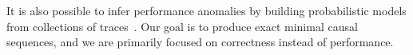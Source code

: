 {It is also possible to infer
 performance anomalies by building probabilistic models from
 collections of traces~\cite{barham2004using,Chen02pinpoint:problem}.
 Our goal is to produce exact minimal causal sequences, and we are primarily focused on
 correctness instead of performance.




}
